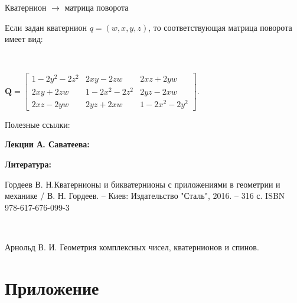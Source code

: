 \documentclass[10pt]{beamer}
\begin{document}
	
	
	\begin{frame}{Кватернион $\rightarrow$ матрица поворота}
		
		Если задан кватернион 
		$q=(w,x,y,z)$, то соответствующая матрица поворота имеет вид:
		
		~
		
		\centering
		$\mathbf Q = \begin{bmatrix}
			1 - 2 y^2 - 2 z^2 & 2 x y - 2 z w & 2 x z + 2 y w \\
			2 x y + 2 z w & 1 - 2 x^2 - 2 z^2 & 2 y z - 2 x w \\
			2 x z - 2 y w & 2 y z + 2 x w & 1 - 2 x^2 - 2 y^2
		\end{bmatrix} .$
	\end{frame}
	
	

	\begin{frame} {Полезные ссылки:}
		
		{
			\textbf{Лекции А. Саватеева:}
			
			
			
			
			
			\textbf{Литература: }
			
		}
		{
			 
			 Гордеев В. Н.Кватернионы и бикватернионы с приложениями в геометрии и
			 механике / В. Н. Гордеев. – Киев: Издательство "Сталь", 2016. – 316 с.
			 ISBN 978-617-676-099-3
			 
			 ~
			 
			 Арнольд В. И. Геометрия комплексных чисел, кватернионов и спинов.
		}

		
	\end{frame}
	
 \appendix
 
 \section{Приложение}
 
\end{document}
